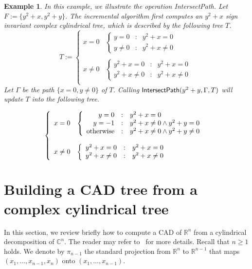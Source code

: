 \documentclass[10pt]{article}
\def\C {\ensuremath{\mathbb{C}}}
\def\R {\ensuremath{\mathbb{R}}}
\newtheorem{Example}{Example}
\newcommand{\IntersectPath}[1]{\mbox{{\sf IntersectPath}$(#1)$}}
\begin{document}
\begin{Example}
In this example, we illustrate the operation {\sf IntersectPath}. 
Let $F := \{y^2+x, y^2+y\}$. 
The incremental algorithm first computes an $y^2+x$
sign invariant complex cylindrical tree, 
which is described by the following tree $T$.
$$
T := \left\{
\begin{array}{ll}
{x = 0}  & \left\{
        \begin{array}{rcl}
         {y = 0}   &:& { y^2+x=0}\\
         y\neq 0 &:& { y^2+x\neq0}
        \end{array}
        \right.\\
&\\
x\neq 0& \left\{
        \begin{array}{rcl}
         y^2+x = 0   &:& { y^2+x=0} \\
         y^2+x\neq 0 &:& { y^2+x\neq0}
        \end{array}
        \right.\\ 
\end{array}
\right.
$$
Let $\Gamma$ be the path $\{x=0, y\neq 0\}$ of $T$. 
Calling $\IntersectPath{y^2+y, \Gamma, T}$
will update $T$ into the following tree.

$$
\left\{
\begin{array}{ll}
{ x = 0}  & \left\{
        \begin{array}{rcl}
         {y = 0}   &:& { y^2+x=0}\\
         { y = -1}  &:& { y^2+x\neq0\wedge y^2+y=0}\\
         { \rm otherwise} &:& { y^2+x\neq0\wedge y^2+y\neq 0}\\
        \end{array}
        \right.\\
&\\
x\neq 0& \left\{
        \begin{array}{rcl}
         y^2+x = 0   &:& { y^2+x=0} \\
         y^2+x\neq 0 &:& { y^2+x\neq0}
        \end{array}
        \right.\\ 
\end{array}
\right.
$$

\end{Example}


\section{Building a CAD tree from a complex cylindrical tree}
\label{sec:cad}
In this section, we review briefly how to compute a
CAD of $\R^n$ from a cylindrical decomposition of $\C^n$.
The reader may refer to~\cite{CMXY09} for more details.
Recall that $n \geq 1$ holds. We denote by ${\pi}_{n-1}$  the
standard projection from ${\R}^n$ to ${\R}^{n-1}$ that
maps $(x_1, \ldots, x_{n-1}, x_n)$ onto $(x_1, \ldots, x_{n-1})$.
\end{document}

